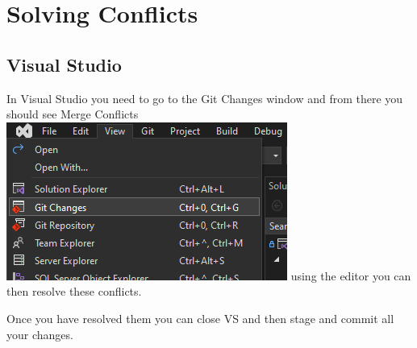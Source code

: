 \chapter{Solving Conflicts}
\chapteroverlay
\section{Visual Studio}
In Visual Studio you need to go to the Git Changes window and from there you should see Merge Conflicts
\includegraphics{Images/view_git}
using the editor you can then resolve these conflicts.

Once you have resolved them you can close VS and then stage and commit all your changes.